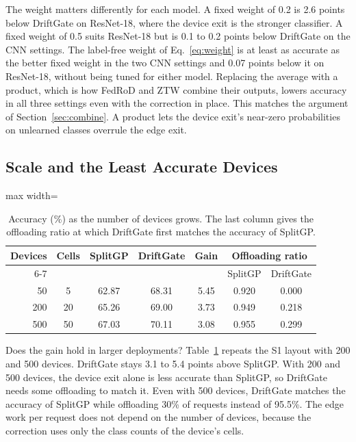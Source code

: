 The weight matters differently for each model. A fixed weight of 0.2 is 2.6 points below DriftGate on ResNet-18, where the device exit is the stronger classifier. A fixed weight of 0.5 suits ResNet-18 but is 0.1 to 0.2 points below DriftGate on the CNN settings. The label-free weight of Eq.~\eqref{eq:weight} is at least as accurate as the better fixed weight in the two CNN settings and 0.07 points below it on ResNet-18, without being tuned for either model. Replacing the average with a product, which is how FedRoD and ZTW combine their outputs, lowers accuracy in all three settings even with the correction in place. This matches the argument of Section~\ref{sec:combine}. A product lets the device exit's near-zero probabilities on unlearned classes overrule the edge exit.

\subsection{Scale and the Least Accurate Devices}
\label{sec:scale}

\begin{table}[t]
\centering
\caption{Accuracy (\%) as the number of devices grows. The last column gives the offloading ratio at which DriftGate first matches the accuracy of SplitGP.}
\label{tab:scale}
\begin{adjustbox}{max width=\columnwidth}
\begin{tabular}{rcccccc}
\toprule
Devices & Cells & SplitGP & DriftGate & Gain & \multicolumn{2}{c}{Offloading ratio} \\
\cmidrule(lr){6-7}
 & & & & & SplitGP & DriftGate \\
\midrule
50 & 5 & 62.87 & 68.31 & 5.45 & 0.920 & 0.000 \\
200 & 20 & 65.26 & 69.00 & 3.73 & 0.949 & 0.218 \\
500 & 50 & 67.03 & 70.11 & 3.08 & 0.955 & 0.299 \\
\bottomrule
\end{tabular}
\end{adjustbox}
\end{table}

Does the gain hold in larger deployments? Table~\ref{tab:scale} repeats the S1 layout with 200 and 500 devices. DriftGate stays 3.1 to 5.4 points above SplitGP. With 200 and 500 devices, the device exit alone is less accurate than SplitGP, so DriftGate needs some offloading to match it. Even with 500 devices, DriftGate matches the accuracy of SplitGP while offloading 30\% of requests instead of 95.5\%. The edge work per request does not depend on the number of devices, because the correction uses only the class counts of the device's cells.


